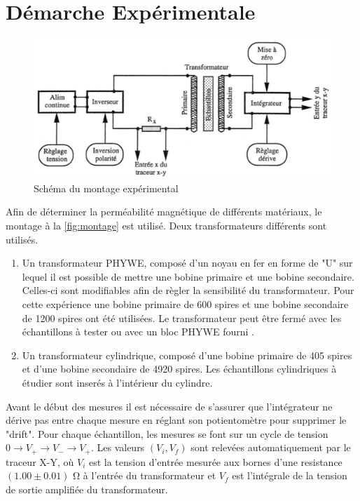 \section{Démarche Expérimentale}

\begin{figure}[h]
    \centering
    \includegraphics[width=0.8\linewidth]{figures/montage.png}
    \caption{Schéma du montage expérimental \cite{notice}}
    \label{fig:montage}
\end{figure}

Afin de déterminer la perméabilité magnétique de différents matériaux, le montage à la \autoref{fig:montage} est utilisé. Deux transformateurs différents sont utilisés.

\begin{enumerate}
    \item Un transformateur PHYWE, composé d'un noyau en fer en forme de "U" sur lequel il est possible de mettre une bobine primaire et une bobine secondaire. Celles-ci sont modifiables afin de règler la sensibilité du transformateur. Pour cette expérience une bobine primaire de 600 spires et une bobine secondaire de 1200 spires ont été utilisées. Le transformateur peut être fermé avec les échantillons à tester ou avec un bloc PHYWE fourni \cite{bloc_phywe}.
    \item Un transformateur cylindrique, composé d'une bobine primaire de 405 spires et d'une bobine secondaire de 4920 spires. Les échantillons cylindriques à étudier sont inserés à l'intérieur du cylindre.
\end{enumerate}

Avant le début des mesures il est nécessaire de s'assurer que l'intégrateur ne dérive pas entre chaque mesure en réglant son potientomètre pour supprimer le "drift". Pour chaque échantillon, les mesures se font sur un cycle de tension \(0 \rightarrow V_+ \rightarrow V_- \rightarrow V_+\). Les valeurs \((V_i, V_f)\) sont relevées automatiquement par le traceur X-Y, où \(V_i\) est la tension d'entrée mesurée aux bornes d'une resistance \((1.00 \pm 0.01)\) \si{\ohm} à l'entrée du transformateur et \(V_f\) est l'intégrale de la tension de sortie amplifiée du transformateur.
